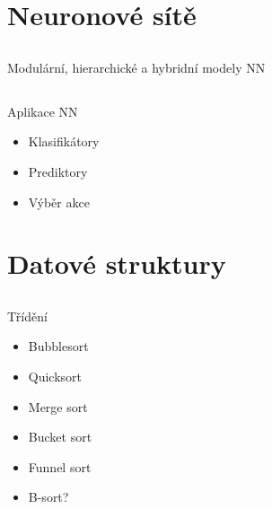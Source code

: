\documentclass{beamer}
\begin{document}
\section{Neuronové sítě}

\subsection{}
\begin{frame}{Modulární, hierarchické a hybridní modely NN}
\end{frame}

\subsection{}
\begin{frame}{Aplikace NN}
\begin{itemize}
\item Klasifikátory
\item Prediktory
\item Výběr akce
\end{itemize}
\end{frame}

\subsection{}

\section{Datové struktury}

\subsection{}
\begin{frame}{Třídění}
\begin{itemize}
\item Bubblesort
\item Quicksort
\item Merge sort
\item Bucket sort
\item Funnel sort
\item B-sort?
\end{itemize}
\end{frame}
\end{document}
